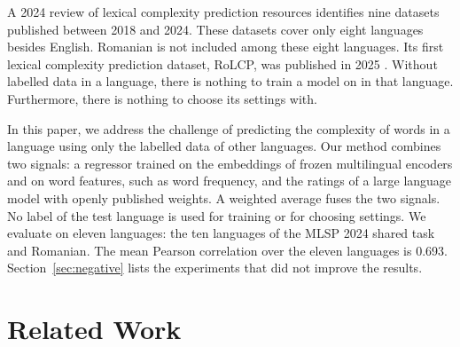 A 2024 review of lexical complexity prediction resources \citep{shardlow-etal-2024-multilingual}
identifies nine datasets published between 2018 and 2024. These datasets cover only eight languages
besides English. Romanian is not included among these eight languages. Its first lexical complexity
prediction dataset, RoLCP, was published in 2025 \citep{anghel-etal-2025-rals}. Without labelled
data in a language, there is nothing to train a model on in that language. Furthermore, there is
nothing to choose its settings with.

In this paper, we address the challenge of predicting the complexity of words in a language using
only the labelled data of other languages. Our method combines two signals: a regressor trained on
the embeddings of frozen multilingual encoders and on word features, such as word frequency, and the
ratings of a large language model with openly published weights. A weighted average fuses the two
signals. No label of the test language is used for training or for choosing settings. We evaluate on
eleven languages: the ten languages of the MLSP 2024 shared task \citep{shardlow-etal-2024-bea} and
Romanian. The mean Pearson correlation over the eleven languages is 0.693.
Section~\ref{sec:negative} lists the experiments that did not improve the results.

\section{Related Work}
\label{sec:related}

